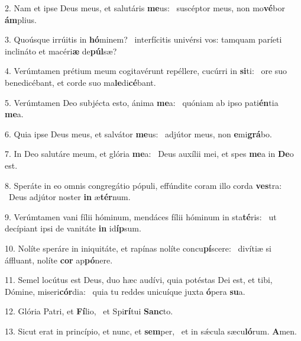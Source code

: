 2. Nam et ipse Deus meus, et salutáris \textbf{me}us: \ast\  suscéptor meus, non mo\textbf{vé}bor \textbf{ám}plius.\

3. Quoúsque irrúitis in \textbf{hó}minem? \ast\  interfícitis univérsi vos: tamquam paríeti inclináto et macéri\textbf{æ} de\textbf{púl}sæ?\

4. Verúmtamen prétium meum cogitavérunt repéllere, cucúrri in \textbf{si}ti: \ast\  ore suo benedicébant, et corde suo ma\textbf{le}di\textbf{cé}bant.\

5. Verúmtamen Deo subjécta esto, ánima \textbf{me}a: \ast\  quóniam ab ipso pati\textbf{én}tia \textbf{me}a.\

6. Quia ipse Deus meus, et salvátor \textbf{me}us: \ast\  adjútor meus, non \textbf{e}mi\textbf{grá}bo.\

7. In Deo salutáre meum, et glória \textbf{me}a: \ast\  Deus auxílii mei, et spes \textbf{me}a in \textbf{De}o est.\

8. Speráte in eo omnis congregátio pópuli, effúndite coram illo corda \textbf{ves}tra: \ast\  Deus adjútor noster \textbf{in} æ\textbf{tér}num.\

9. Verúmtamen vani fílii hóminum, mendáces fílii hóminum in sta\textbf{té}ris: \ast\  ut decípiant ipsi de vanitáte \textbf{in} id\textbf{íp}sum.\

10. Nolíte speráre in iniquitáte, et rapínas nolíte concu\textbf{pí}scere: \ast\  divítiæ si áffluant, nolíte \textbf{cor} ap\textbf{pó}nere.\

11. Semel locútus est Deus, duo hæc audívi, quia potéstas Dei est, et tibi, Dómine, miseri\textbf{cór}dia: \ast\  quia tu reddes unicuíque juxta \textbf{ó}pera \textbf{su}a.\

12. Glória Patri, et \textbf{Fí}lio, \ast\  et Spi\textbf{rí}tui \textbf{Sanc}to.\

13. Sicut erat in princípio, et nunc, et \textbf{sem}per, \ast\  et in sǽcula sæcu\textbf{ló}rum. \textbf{A}men.\

